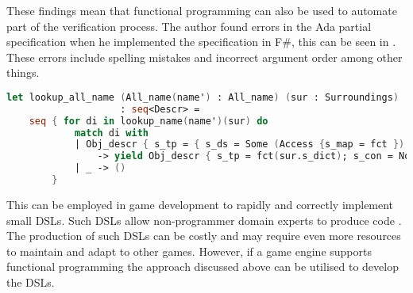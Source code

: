 These findings mean that functional programming can also be used to automate part of the verification process. The author found errors in the Ada partial specification when he implemented the specification in F\#, this can be seen in . These errors include spelling mistakes and incorrect argument order among other things.

\begin{lstlisting}[language=fsharp, caption={Sestoft's F\# Implementation of Ada \cite{sestoft:isola}},label={lst:ada-fsh-impl}]
let lookup_all_name (All_name(name') : All_name) (sur : Surroundings)
                    : seq<Descr> =
    seq { for di in lookup_name(name')(sur) do
            match di with
            | Obj_descr { s_tp = { s_ds = Some (Access {s_map = fct }) } }
                -> yield Obj_descr { s_tp = fct(sur.s_dict); s_con = None }
            | _ -> ()
        }
\end{lstlisting}

This can be employed in game development to rapidly and correctly implement small \acp{DSL}. Such \acp{DSL} allow non-programmer domain experts to produce code \cite{beyak2011saga}. The production of such \acp{DSL} can be costly and may require even more resources to maintain and adapt to other games. However, if a game engine supports functional programming the approach discussed above can be utilised to develop the \acp{DSL}.
